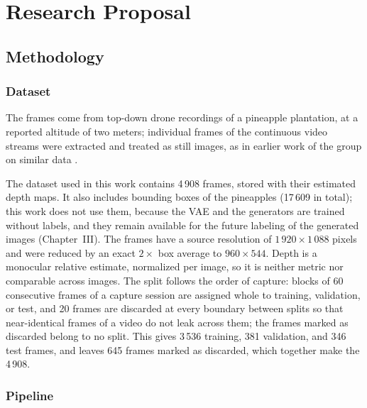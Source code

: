   \renewcommand{\baselinestretch}{1.5}

\chapter{Research Proposal}

\section{Methodology}

\subsection{Dataset}

The frames come from top-down drone recordings of a pineapple plantation, at a reported altitude of two meters; individual frames of the continuous video streams were extracted and treated as still images, as in earlier work of the group on similar data \cite{Gonzalez2026,XieLi2025VAE}. %

The dataset used in this work contains 4\,908 frames, stored with their estimated depth maps. It also includes bounding boxes of the pineapples (17\,609 in total); this work does not use them, because the VAE and the generators are trained without labels, and they remain available for the future labeling of the generated images (Chapter~III). The frames have a source resolution of $1\,920\times1\,088$ pixels and were reduced by an exact $2\times$ box average to $960\times544$. Depth is a monocular relative estimate, normalized per image, so it is neither metric nor comparable across images. The split follows the order of capture: blocks of 60 consecutive frames of a capture session are assigned whole to training, validation, or test, and 20 frames are discarded at every boundary between splits so that near-identical frames of a video do not leak across them; the frames marked as discarded belong to no split. This gives 3\,536 training, 381 validation, and 346 test frames, and leaves 645 frames marked as discarded, which together make the 4\,908.

\subsection{Pipeline}

